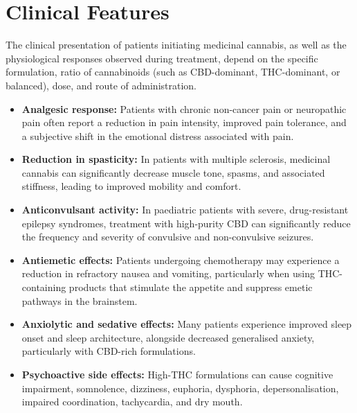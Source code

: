 \section*{Clinical Features}
The clinical presentation of patients initiating medicinal cannabis, as well as the physiological responses observed during treatment, depend on the specific formulation, ratio of cannabinoids (such as CBD-dominant, THC-dominant, or balanced), dose, and route of administration.
\begin{itemize}
    \item \textbf{Analgesic response:} Patients with chronic non-cancer pain or neuropathic pain often report a reduction in pain intensity, improved pain tolerance, and a subjective shift in the emotional distress associated with pain.
    \item \textbf{Reduction in spasticity:} In patients with multiple sclerosis, medicinal cannabis can significantly decrease muscle tone, spasms, and associated stiffness, leading to improved mobility and comfort.
    \item \textbf{Anticonvulsant activity:} In paediatric patients with severe, drug-resistant epilepsy syndromes, treatment with high-purity CBD can significantly reduce the frequency and severity of convulsive and non-convulsive seizures.
    \item \textbf{Antiemetic effects:} Patients undergoing chemotherapy may experience a reduction in refractory nausea and vomiting, particularly when using THC-containing products that stimulate the appetite and suppress emetic pathways in the brainstem.
    \item \textbf{Anxiolytic and sedative effects:} Many patients experience improved sleep onset and sleep architecture, alongside decreased generalised anxiety, particularly with CBD-rich formulations.
    \item \textbf{Psychoactive side effects:} High-THC formulations can cause cognitive impairment, somnolence, dizziness, euphoria, dysphoria, depersonalisation, impaired coordination, tachycardia, and dry mouth.
\end{itemize}

